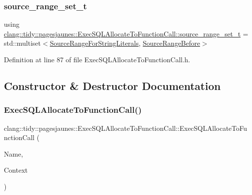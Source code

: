\subsubsection{\texorpdfstring{source\+\_\+range\+\_\+set\+\_\+t}{source\_range\_set\_t}}
{\footnotesize\ttfamily using \hyperlink{classclang_1_1tidy_1_1pagesjaunes_1_1_exec_s_q_l_allocate_to_function_call_adcae58fbc0cce6f6c8ada7fea6a8e7f1}{clang\+::tidy\+::pagesjaunes\+::\+Exec\+S\+Q\+L\+Allocate\+To\+Function\+Call\+::source\+\_\+range\+\_\+set\+\_\+t} =  std\+::multiset$<$\hyperlink{classclang_1_1tidy_1_1pagesjaunes_1_1_exec_s_q_l_allocate_to_function_call_1_1_source_range_for_string_literals}{Source\+Range\+For\+String\+Literals}, \hyperlink{classclang_1_1tidy_1_1pagesjaunes_1_1_exec_s_q_l_allocate_to_function_call_1_1_source_range_before}{Source\+Range\+Before}$>$}



Definition at line 87 of file Exec\+S\+Q\+L\+Allocate\+To\+Function\+Call.\+h.



\subsection{Constructor \& Destructor Documentation}
\mbox{\label{classclang_1_1tidy_1_1pagesjaunes_1_1_exec_s_q_l_allocate_to_function_call_aa46155f099743916f57a31170e7f7d5b}} 
\subsubsection{\texorpdfstring{Exec\+S\+Q\+L\+Allocate\+To\+Function\+Call()}{ExecSQLAllocateToFunctionCall()}}
{\footnotesize\ttfamily clang\+::tidy\+::pagesjaunes\+::\+Exec\+S\+Q\+L\+Allocate\+To\+Function\+Call\+::\+Exec\+S\+Q\+L\+Allocate\+To\+Function\+Call (\begin{DoxyParamCaption}\item[{String\+Ref}]{Name,  }\item[{Clang\+Tidy\+Context $\ast$}]{Context }\end{DoxyParamCaption})}



